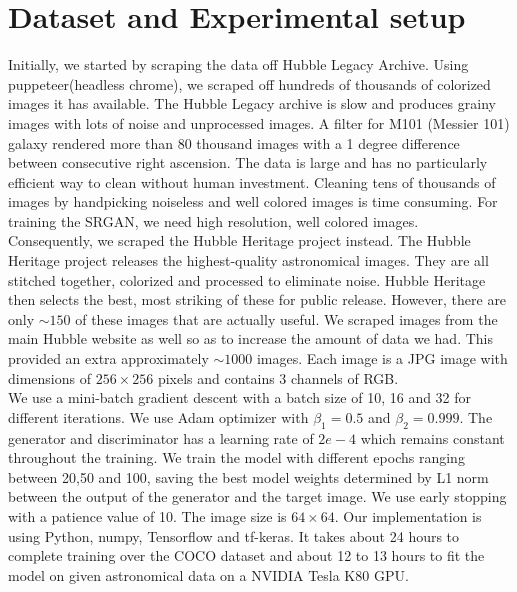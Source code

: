 \documentclass[oneside,a4paper,12pt]{report}
\begin{document}
\section{Dataset and Experimental setup}
\hspace*{0.25 in}Initially, we started by scraping the data off Hubble Legacy Archive. Using puppeteer(headless chrome), we scraped off hundreds of thousands of colorized images it has available. The Hubble Legacy archive is slow and produces grainy images with lots of noise and unprocessed images. A filter for M101 (Messier 101) galaxy rendered more than 80 thousand images with a 1 degree difference between consecutive right ascension. The data is large and has no particularly efficient way to clean without human investment. Cleaning tens of thousands of images by handpicking noiseless and well colored images is time consuming. For training the SRGAN, we need high resolution, well colored images. \\
\hspace*{0.25 in}Consequently, we scraped the Hubble Heritage project instead. The Hubble Heritage project releases the highest-quality astronomical images. They are all stitched together, colorized and processed to eliminate noise. Hubble Heritage then selects the best, most striking of these for public release. However, there are only $\sim150$ of these images that are actually useful. We scraped images from the main Hubble website as well so as to increase the amount of data we had. This provided an extra approximately $\sim1000$ images.
Each image is a JPG image with dimensions of $256\times 256$ pixels and contains 3 channels of RGB.\\
\hspace*{0.25 in}We use a mini-batch gradient descent with a batch size of 10, 16 and 32 for different iterations. We use Adam optimizer with $\beta_1 = 0.5$ and $\beta_2 = 0.999$. The generator and discriminator has a learning rate of $2e-4$ which remains constant throughout the training. We train the model with different epochs ranging between 20,50 and 100, saving the best model weights determined by L1 norm between the output of the generator and the target image. We use early stopping with a patience value of 10. The image size is $64\times64$. Our implementation is using Python, numpy, Tensorflow and tf-keras. It takes about 24 hours to complete training over the COCO dataset and about 12 to 13 hours to fit the model on given astronomical data on a NVIDIA Tesla K80 GPU.
\pagebreak
\end{document}
